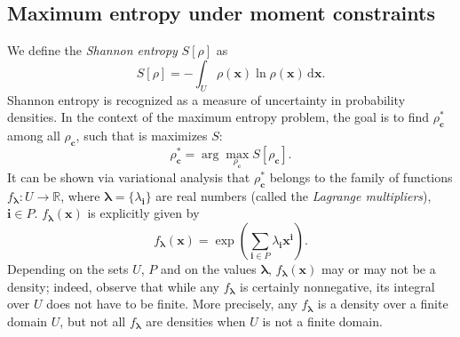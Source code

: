\documentclass[12pt]{amsart}
\numberwithin{equation}{section}
\newcommand\BS{\boldsymbol}
\newcommand\dif{\,\mathrm{d}}
\begin{document}
\subsection{Maximum entropy under moment constraints}

We define the {\em Shannon entropy} $S[\rho]$ as
%
\begin{equation}
\label{eq:entropy}
S[\rho]=-\int_U\rho(\BS x)\ln\rho(\BS x)\dif\BS x.
\end{equation}
%
Shannon entropy is recognized as a measure of uncertainty in
probability densities. In the context of the maximum entropy problem,
the goal is to find $\rho_{\BS c}^*$ among all $\rho_{\BS c}$, such
that is maximizes $S$:
%
\begin{equation}
\rho_{\BS c}^*=\arg\max_{\rho_{\BS c}}S[\rho_{\BS c}].
\end{equation}
%
It can be shown via variational analysis that $\rho_{\BS c}^*$ belongs
to the family of functions $f_{\BS\lambda}:U\to\mathbb R$, where
$\BS\lambda=\{\lambda_{\BS i}\}$ are real numbers (called the {\em
  Lagrange multipliers}), $\BS i\in P$. $f_{\BS\lambda}(\BS x)$ is
explicitly given by
%
\begin{equation}
f_{\BS\lambda}(\BS x)=\exp\left(\sum_{\BS i\in P}\lambda_{\BS i}\BS
x^{\BS i}\right).
\end{equation}
%
Depending on the sets $U$, $P$ and on the values $\BS\lambda$,
$f_{\BS\lambda}(\BS x)$ may or may not be a density; indeed, observe
that while any $f_{\BS\lambda}$ is certainly nonnegative, its integral
over $U$ does not have to be finite. More precisely, any
$f_{\BS\lambda}$ is a density over a finite domain $U$, but not all
$f_{\BS\lambda}$ are densities when $U$ is not a finite domain.
\end{document}
